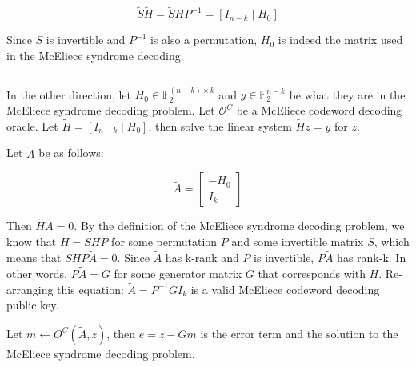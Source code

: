 \documentclass{article}
\begin{document}
\begin{equation*}
    \tilde{S}\tilde{H} = \tilde{S}HP^{-1} = [I_{n-k} \mid H_0]
\end{equation*}

Since $\tilde{S}$ is invertible and $P^{-1}$ is also a permutation, $H_0$ is indeed the matrix used in the McEliece syndrome decoding.

$$ $$

In the other direction, let $H_0 \in \mathbb{F}_2^{(n-k) \times k}$ and $y \in \mathbb{F}_2^{n-k}$ be what they are in the McEliece syndrome decoding problem. Let $\mathcal{O}^C$ be a McEliece codeword decoding oracle. Let $\tilde{H} = [I_{n-k} \mid H_0]$, then solve the linear system $\tilde{H}z = y$ for $z$.

Let $\tilde{A}$ be as follows:

\begin{equation*}
    \tilde{A} = \begin{bmatrix}
        -H_0 \\ I_k
    \end{bmatrix}
\end{equation*}

Then $\tilde{H}\tilde{A} = 0$. By the definition of the McEliece syndrome decoding problem, we know that $\tilde{H} = SHP$ for some permutation $P$ and some invertible matrix $S$, which means that $SHP\tilde{A} = 0$. Since $\tilde{A}$ has k-rank and $P$ is invertible, $P\tilde{A}$ has rank-k. In other words, $P\tilde{A} = G$ for some generator matrix $G$ that corresponds with $H$. Re-arranging this equation: $\tilde{A} = P^{-1}GI_k$ is a valid McEliece codeword decoding public key.

Let $m \leftarrow O^C(\tilde{A}, z)$, then $e = z - Gm$ is the error term and the solution to the McEliece syndrome decoding problem.
\end{document}

